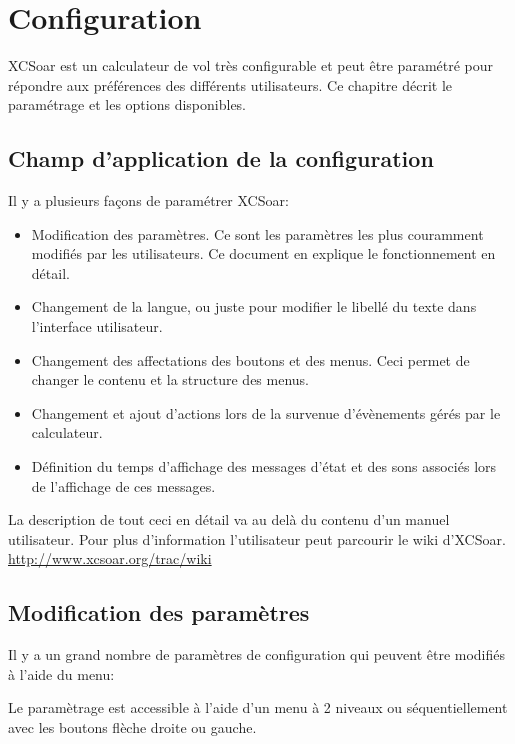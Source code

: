 \chapter{Configuration}\label{cha:configuration}
XCSoar est un calculateur de vol très configurable et peut être paramétré pour répondre aux préférences des différents utilisateurs. Ce chapitre décrit le paramétrage et les options disponibles.

\section{Champ d'application de la configuration}
Il y a plusieurs façons de paramétrer XCSoar:
\begin{itemize}

\item Modification des paramètres. Ce sont les paramètres les plus couramment modifiés par les utilisateurs. Ce document en explique le fonctionnement en détail.
\item Changement de la langue, ou juste pour modifier le libellé du texte dans l'interface utilisateur.
\item Changement des affectations des boutons et des menus. Ceci permet de changer le contenu et la structure des menus.
\item Changement et ajout d'actions lors de la survenue d'évènements gérés par le calculateur.
\item Définition du temps d'affichage des messages d'état et des sons associés lors de l'affichage de ces messages.
\end{itemize}
La description de tout ceci en détail va au delà du contenu d'un manuel utilisateur. Pour plus d'information l'utilisateur peut parcourir le wiki d'XCSoar. \url{http://www.xcsoar.org/trac/wiki}

\section{Modification des paramètres}

Il y a un grand nombre de paramètres de configuration qui peuvent être modifiés à l'aide du menu:
\begin{quote}
\blink{}
\end{quote}
Le paramètrage est accessible à l'aide d'un menu à 2 niveaux ou séquentiellement avec les boutons flèche droite ou gauche.

